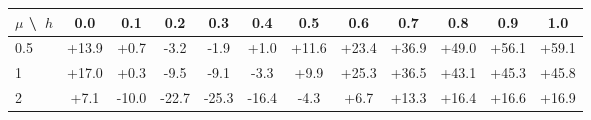\begin{tabular}{lccccccccccc}
\toprule
$\mu$ \textbackslash\ $h$ & 0.0 & 0.1 & 0.2 & 0.3 & 0.4 & 0.5 & 0.6 & 0.7 & 0.8 & 0.9 & 1.0 \\
\midrule
0.5 & +13.9 & +0.7 & -3.2 & -1.9 & +1.0 & +11.6 & +23.4 & +36.9 & +49.0 & +56.1 & +59.1 \\
1 & +17.0 & +0.3 & -9.5 & -9.1 & -3.3 & +9.9 & +25.3 & +36.5 & +43.1 & +45.3 & +45.8 \\
2 & +7.1 & -10.0 & -22.7 & -25.3 & -16.4 & -4.3 & +6.7 & +13.3 & +16.4 & +16.6 & +16.9 \\
\bottomrule
\end{tabular}